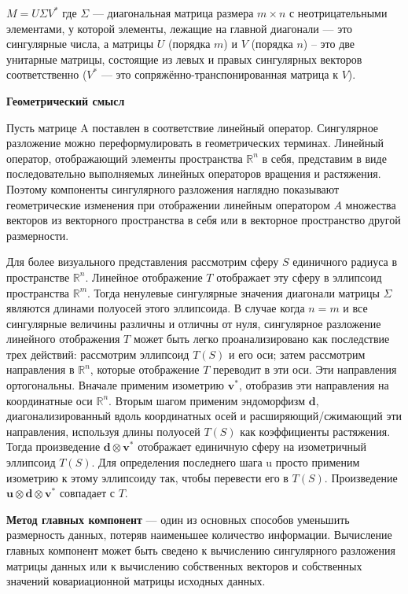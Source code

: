 {}\documentclass{article}
\begin{document}
$M=U\Sigma V^{*}$
где $\Sigma$ — диагональная матрица размера $m\times n$ с неотрицательными элементами,
у которой элементы, лежащие на главной диагонали — это сингулярные числа, а матрицы $U$ (порядка $m$) и
$V$ (порядка $n$) -- это две унитарные матрицы, состоящие из левых и правых сингулярных векторов соответственно
($V^*$ — это сопряжённо-транспонированная матрица к $V$).

\textbf{Геометрический смысл}

Пусть матрице A поставлен в соответствие линейный оператор.
Сингулярное разложение можно переформулировать в геометрических терминах.
Линейный оператор, отображающий элементы пространства $\mathbb{R}^{n}$ в себя, представим в
виде последовательно выполняемых линейных операторов вращения и растяжения.
Поэтому компоненты сингулярного разложения наглядно показывают геометрические изменения при отображении линейным
оператором $A$ множества векторов из векторного пространства в себя или в векторное пространство другой размерности.

Для более визуального представления рассмотрим сферу $S$ единичного радиуса в пространстве $\mathbb {R}^{n}$.
Линейное отображение $T$ отображает эту сферу в эллипсоид пространства $\mathbb{R} ^{m}$.
Тогда ненулевые сингулярные значения диагонали матрицы $\Sigma$ являются длинами полуосей этого эллипсоида.
В случае когда $n=m$ и все сингулярные величины различны и отличны от нуля, сингулярное разложение линейного отображения $T$
может быть легко проанализировано как последствие трех действий: рассмотрим эллипсоид $T(S)$ и его оси;
затем рассмотрим направления в $\mathbb {R}^{n}$, которые отображение $T$ переводит в эти оси.
Эти направления ортогональны.
Вначале применим изометрию ${\mathbf {v}}^{*}$, отобразив эти направления на координатные оси $\mathbb {R}^{n}$.
Вторым шагом применим эндоморфизм $\mathbf{d}$, диагонализированный вдоль координатных осей и расширяющий/сжимающий
эти направления, используя длины полуосей $T(S)$ как коэффициенты растяжения.
Тогда произведение ${\mathbf {d}}\otimes {\mathbf {v}}^{*}$ отображает единичную сферу на изометричный эллипсоид $T(S)$.
Для определения последнего шага u просто применим изометрию к этому эллипсоиду так, чтобы перевести его в $T(S)$.
Произведение ${\mathbf {u}}\otimes {\mathbf {d}}\otimes {\mathbf {v}}^{*}$ совпадает с $T$.

\textbf{Метод главных компонент} — один из основных способов уменьшить размерность данных, потеряв наименьшее
количество информации.
Вычисление главных компонент может быть сведено к вычислению сингулярного разложения матрицы данных или к вычислению
собственных векторов и собственных значений ковариационной матрицы исходных данных.
\end{document}

